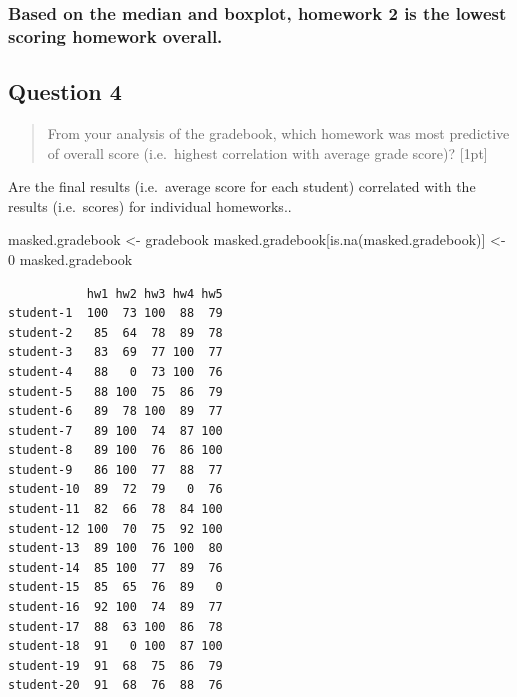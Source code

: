 \documentclass[
  letterpaper,
  DIV=11,
  numbers=noendperiod]{scrartcl}
\newenvironment{Shaded}{\begin{snugshade}}{\end{snugshade}}
\newcommand{\DecValTok}[1]{\textcolor[rgb]{0.68,0.00,0.00}{#1}}
\newcommand{\FunctionTok}[1]{\textcolor[rgb]{0.28,0.35,0.67}{#1}}
\newcommand{\NormalTok}[1]{\textcolor[rgb]{0.00,0.23,0.31}{#1}}
\newcommand{\OtherTok}[1]{\textcolor[rgb]{0.00,0.23,0.31}{#1}}
\begin{document}
\hypertarget{based-on-the-median-and-boxplot-homework-2-is-the-lowest-scoring-homework-overall.}{%
\subsubsection{\texorpdfstring{Based on the median and boxplot,
\textbf{homework 2} is the lowest scoring homework
overall.}{Based on the median and boxplot, homework 2 is the lowest scoring homework overall.}}\label{based-on-the-median-and-boxplot-homework-2-is-the-lowest-scoring-homework-overall.}}

\hypertarget{question-4}{%
\subsection{Question 4}\label{question-4}}

\begin{quote}
From your analysis of the gradebook, which homework was most predictive
of overall score (i.e.~highest correlation with average grade score)?
{[}1pt{]}
\end{quote}

Are the final results (i.e.~average score for each student) correlated
with the results (i.e.~scores) for individual homeworks..

\begin{Shaded}
\begin{Highlighting}[]
\NormalTok{masked.gradebook }\OtherTok{\textless{}{-}}\NormalTok{ gradebook}
\NormalTok{masked.gradebook[}\FunctionTok{is.na}\NormalTok{(masked.gradebook)] }\OtherTok{\textless{}{-}} \DecValTok{0}
\NormalTok{masked.gradebook}
\end{Highlighting}
\end{Shaded}

\begin{verbatim}
           hw1 hw2 hw3 hw4 hw5
student-1  100  73 100  88  79
student-2   85  64  78  89  78
student-3   83  69  77 100  77
student-4   88   0  73 100  76
student-5   88 100  75  86  79
student-6   89  78 100  89  77
student-7   89 100  74  87 100
student-8   89 100  76  86 100
student-9   86 100  77  88  77
student-10  89  72  79   0  76
student-11  82  66  78  84 100
student-12 100  70  75  92 100
student-13  89 100  76 100  80
student-14  85 100  77  89  76
student-15  85  65  76  89   0
student-16  92 100  74  89  77
student-17  88  63 100  86  78
student-18  91   0 100  87 100
student-19  91  68  75  86  79
student-20  91  68  76  88  76
\end{verbatim}
\end{document}
